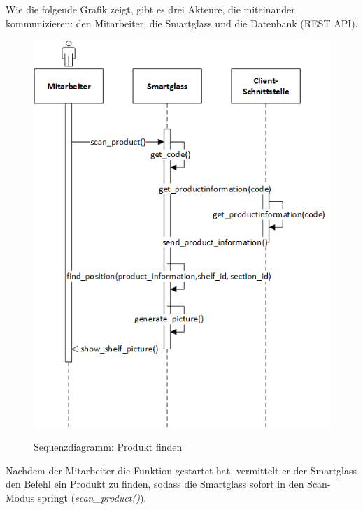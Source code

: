 Wie die folgende Grafik zeigt, gibt es drei Akteure, die miteinander kommunizieren: den Mitarbeiter, die Smartglass und die Datenbank (REST API).
\begin{figure}[H]
	\centering
	{\includegraphics[scale=0.8]{Bilder/Abbildungen/SMAR_produkt_finden_Sequenzdiagramm.png}}
	\caption{Sequenzdiagramm: Produkt finden}
	\label{fig:jwt_encode}
\end{figure}
Nachdem der Mitarbeiter die Funktion gestartet hat, vermittelt er der Smartglass den Befehl ein Produkt zu finden, sodass die Smartglass sofort in den Scan-Modus springt (\emph{scan\_product()}). 

